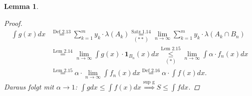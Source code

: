 \documentclass[a4paper]{report}
\newcommand{\doubleOne}{\textbf{1}}
\newcommand{\toInf}{\rightarrow \infty}
\newcommand{\limToInf}[1]{\lim_{#1 \toInf}}
\newcommand{\jshortlink}[1]{\jhyperref{#1}{\text{#1}}}
\newcommand{\jhyperref}[2]{\hyperref[j_#1]{#2}}
\theoremstyle{plain}
\newtheorem{lem}[thm]{Lemma}
\theoremstyle{definition}
\begin{document}
{{{\begin{lem}
\begin{proof}
        \begin{displaymath}
            \begin{split}
                \int g(x) dx &\overset{\jshortlink{Def 2.13}}{=} \sum_{k=1}^m y_k \cdot \lambda(A_k) \overset{\jshortlink{Satz 1.14}}{\underset{(**)}{=}} \limToInf{n} \sum_{k=1}^m y_k \cdot \lambda(A_k \cap B_n)\\
                &\overset{\jshortlink{Lem 2.14}}{=} \limToInf{n} \int g(x)\cdot \doubleOne_{B_n}(x) dx \overset{\jshortlink{Lem 2.15}}{\underset{(*)}{\le}} \limToInf{n} \int \alpha\cdot  f_n(x) dx\\
                &\overset{\jshortlink{Lem 2.15}}{=} \alpha\cdot \limToInf{n} \int f_n(x) dx \overset{\jshortlink{Def 2.16}}{=} \alpha\cdot \int f(x) dx.
            \end{split}
        \end{displaymath}
         Daraus folgt mit $\alpha \rightarrow 1$: $\int g dx \le \int f(x) dx \overset{\text{sup g}}{\Rightarrow} S \le \int f dx$.
    \end{proof}
\end{lem}

}}}
\end{document}
